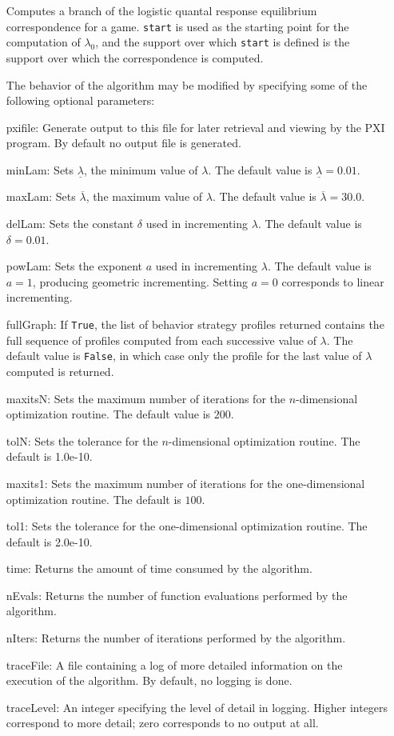 \begin{itemize}
\bd 
Computes a branch of the logistic quantal response equilibrium
correspondence for a game. \verb+start+ is
used as the starting point for the computation of $\lambda_{0}$, and
the support over which \verb+start+ is defined is the support over
which the correspondence is computed.

The behavior of the algorithm may be modified by specifying some of the
following optional parameters:
\bd
\item
[pxifile:] Generate output to this file for later retrieval and viewing by
the PXI program.  By default no output file is generated.
\item
[minLam:] Sets $\underline{\lambda}$, the minimum value of $\lambda$.  The 
default value is $\underline{\lambda}=0.01$.
\item
[maxLam:] Sets $\overline{\lambda}$, the maximum value of $\lambda$.  The
default value is $\overline{\lambda}=30.0$.
\item
[delLam:] Sets the constant $\delta$ used in incrementing $\lambda$.  The
default value is $\delta=0.01$.
\item
[powLam:] Sets the exponent $a$ used in incrementing $\lambda$.  The default
value is $a=1$, producing geometric incrementing.  Setting $a=0$ corresponds
to linear incrementing.
\item
[fullGraph:] If \verb+True+, the list of behavior strategy profiles
returned contains the full sequence of profiles computed from each successive
value of $\lambda$.  The default value is \verb+False+, in which case only
the profile for the last value of $\lambda$ computed is returned.
\item
[maxitsN:] Sets the maximum number of iterations for the $n$-dimensional
optimization routine.  The default value is $200$.
\item
[tolN:] Sets the tolerance for the $n$-dimensional optimization routine.
The default is 1.0e-10.
\item
[maxits1:] Sets the maximum number of iterations for the one-dimensional
optimization routine.  The default is $100$.
\item
[tol1:] Sets the tolerance for the one-dimensional optimization routine.
The default is 2.0e-10.
\item
[time:] Returns the amount of time consumed by the
algorithm.
\item
[nEvals:] Returns the number of function evaluations
performed by the algorithm.
\item
[nIters:] Returns the number of iterations performed
by the algorithm.
\item
[traceFile:] A file containing a log of more detailed information on
the execution of the algorithm.  By default, no logging is done.
\item
[traceLevel:] An integer specifying the level of detail in logging.
Higher integers correspond to more detail; zero corresponds to
no output at all.
\ed


\end{itemize}

